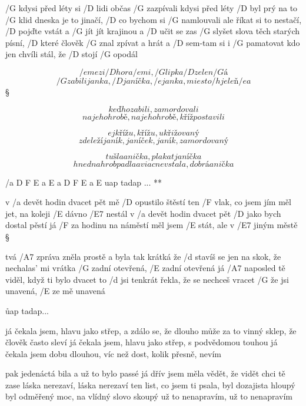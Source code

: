 
/G kdysi před léty si /D lidi občas /G zazpívali
kdysi před léty /D byl prý na to /G klid
dneska je to jinačí, /D co bychom si /G namlouvali
ale říkat si to nestačí, /D pojďte vstát a /G jít
jít krajinou a /D učit se zas /G slyšet slova
těch starých písní, /D které člověk /G znal
zpívat a hrát a /D sem-tam si i /G pamatovat
kdo jen chvíli stál, že /D stojí /G opodál




\[ /e mezi /D hora/e mi, /G lipka /D zelen/G á \]
\[ /G zabili janka, /D janíčka, /e janka, miesto /h jeleň/e a \] \S

\[ keď ho zabili, zamordovali \]
\[ na jeho hrobě, na jeho hrobě, kříž postavili \] \s

\[ ej křížu, křížu, ukřižovaný \]
\[ zde leží janík, janíček, janík, zamordovaný \] \s


\[ tu šla anička, plakat janíčka \]
\[ hned na hrob padla a viac nevstala, dobrá anička \]



\R  /{a D F E a E a D F E a E} uap tadap ... **

v /a devět hodin dvacet pět mě /D opustilo štěstí
ten /F vlak, co jsem jím měl jet, na koleji /E dávno /E7 nestál
v /a devět hodin dvacet pět /D jako bych dostal pěstí
já /F za hodinu na náměstí měl jsem /E stát, ale v /E7 jiným městě \S

tvá /A7 zpráva zněla prostě a byla tak krátká
že /d stavíš se jen na skok, že nechalas' mi vrátka
/G zadní otevřená, /E zadní otevřená
já /A7 naposled tě viděl, když ti bylo dvacet
to /d jsi tenkrát řekla, že se nechceš vracet
/G že jsi unavená, /E ze mě unavená

\r uap tadap...

já čekala jsem, hlavu jako střep, a zdálo se, že dlouho
může za to vinný sklep, že člověk často sleví
já čekala jsem, hlavu jako střep, s podvědomou touhou
já čekala jsem dobu dlouhou, víc než dost, kolik přesně, nevím \s

pak jedenáctá bila a už to bylo passé
já dřív jsem měla vědět, že vidět chci tě zase
láska nerezaví, láska nerezaví
ten list, co jsem ti psala, byl dozajista hloupý
byl odměřený moc, na vlídný slovo skoupý
už to nenapravím, už to nenapravím

\rr




